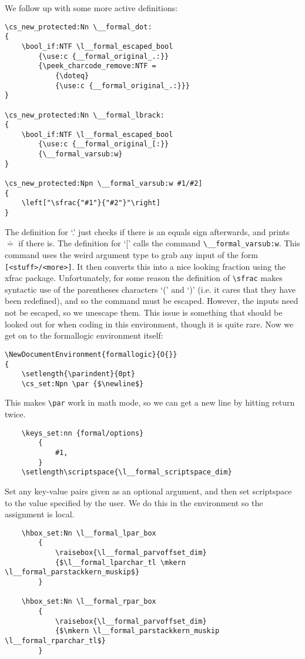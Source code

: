 \documentclass{article}
\begin{document}
We follow up with some more active definitions:
\begin{Verbatim}
\cs_new_protected:Nn \__formal_dot:
{
    \bool_if:NTF \l__formal_escaped_bool 
        {\use:c {__formal_original_.:}}
        {\peek_charcode_remove:NTF =
            {\doteq}
            {\use:c {__formal_original_.:}}}
}

\cs_new_protected:Nn \__formal_lbrack:
{
    \bool_if:NTF \l__formal_escaped_bool 
        {\use:c {__formal_original_[:}}
        {\__formal_varsub:w}
}

\cs_new_protected:Npn \__formal_varsub:w #1/#2]
{
    \left["\sfrac{"#1"}{"#2"}"\right]
}
\end{Verbatim}
The definition for `.' just checks if there is an equals sign afterwards, and prints $\doteq$ if there is. The definition for `[' calls the command \verb|\__formal_varsub:w|. This command uses the weird argument type to grab any input of the form \texttt{[<stuff>/<more>]}. It then converts this into a nice looking fraction using the xfrac package. Unfortunately, for some reason the definition of \verb|\sfrac| makes syntactic use of the parentheses characters `(' and `)' (i.e. it cares that they have been redefined), and so the command must be escaped. However, the inputs need not be escaped, so we unescape them. This issue is something that should be looked out for when coding in this environment, though it is quite rare.\newpage
\noindent Now we get on to the formallogic environment itself:
\begin{Verbatim}
\NewDocumentEnvironment{formallogic}{O{}}
{
    \setlength{\parindent}{0pt}
    \cs_set:Npn \par {$\newline$}
\end{Verbatim}
This makes \verb|\par| work in math mode, so we can get a new line by hitting return twice.
\begin{Verbatim}
    \keys_set:nn {formal/options}
        {
            #1,
        }
    \setlength\scriptspace{\l__formal_scriptspace_dim}
\end{Verbatim}
Set any key-value pairs given as an optional argument, and then set scriptspace to the value specified by the user. We do this in the environment so the assignment is local.
\begin{Verbatim}
    \hbox_set:Nn \l__formal_lpar_box 
        {
            \raisebox{\l__formal_parvoffset_dim}
            {$\l__formal_lparchar_tl \mkern \l__formal_parstackkern_muskip$}
        }

    \hbox_set:Nn \l__formal_rpar_box 
        {
            \raisebox{\l__formal_parvoffset_dim}
            {$\mkern \l__formal_parstackkern_muskip \l__formal_rparchar_tl$}
        }
\end{Verbatim}
\end{document}
